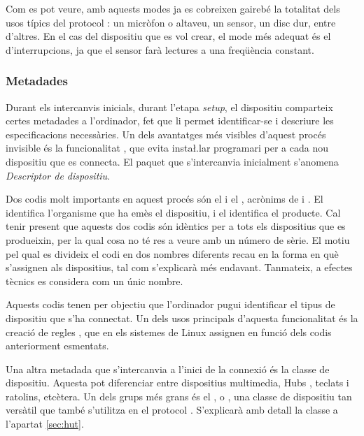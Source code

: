 

Com es pot veure, amb aquests modes ja es cobreixen gairebé la totalitat dels
usos típics del protocol : un micròfon o altaveu, un sensor, un
disc dur, entre d'altres. En el cas del dispositiu que es vol crear, el mode més
adequat és el d'interrupcions, ja que el sensor farà lectures a una freqüència
constant.

\subsubsection*{Metadades}
\label{subsubsec:metadades}

Durant els intercanvis inicials, durant l'etapa \emph{setup}, el dispositiu
comparteix certes metadades a l'ordinador, fet que li permet identificar-se
i descriure les especificacions necessàries. Un dels avantatges més visibles
d'aquest procés invisible és la funcionalitat , que evita
insta\l.lar programari per a cada nou dispositiu que es connecta. El paquet
que s'intercanvia inicialment s'anomena \emph{Descriptor de dispositiu}.

Dos codis molt importants en aquest procés són el  i el ,
acrònims de  i . El  identifica
l'organisme que ha emès el dispositiu, i el  identifica el producte.
Cal tenir present que aquests dos codis són idèntics per a tots els dispositius
que es produeixin, per la qual cosa no té res a veure amb un número de sèrie. El motiu
pel qual es divideix el codi en dos nombres diferents recau en la forma en què
s'assignen als dispositius, tal com s'explicarà més endavant. Tanmateix,
a efectes tècnics es considera com un únic nombre.

Aquests codis tenen per objectiu que l'ordinador pugui identificar el tipus de
dispositiu que s'ha connectat. Un dels usos principals d'aquesta funcionalitat
és la creació de regles , que en els sistemes de Linux assignen
 en funció dels codis anteriorment esmentats.

Una altra metadada que s'intercanvia a l'inici de la connexió és la classe
de dispositiu. Aquesta pot diferenciar entre dispositius multimedia, Hubs
, teclats i ratolins, etcètera. Un dels grups més grans és el
, o , una classe de dispositiu tan
versàtil que també s'utilitza en el protocol . S'explicarà amb
detall la classe  a l'apartat \ref{sec:hut}.

